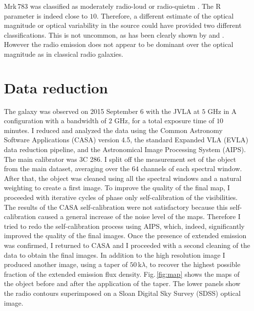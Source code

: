 \documentclass[../thesis.tex]{subfiles}
\begin{document}
Mrk\,783 was classified as moderately radio-loud \citep{Berton15a} or radio-quietm \citep{Doi13}. 
The R parameter is indeed close to $10$. 
Therefore, a different estimate of the optical magnitude or optical variability in the source could have provided two different classifications. 
This is not uncommon, as has been clearly shown by \citet{Ho01} and \citet{Kharb14}.
However the radio emission does not appear to be dominant over the optical magnitude as in classical radio galaxies.




\section{Data reduction}
\label{sec:datared_casa}

The galaxy was observed on 2015 September 6 with the JVLA at $5$ GHz in A configuration with a bandwidth of $2$ GHz, for a total exposure time of $10$ minutes.
I reduced and analyzed the data using the Common Astronomy Software Applications (CASA) version 4.5, the standard Expanded VLA (EVLA) data reduction pipeline, and the Astronomical Image Processing System (AIPS).
The main calibrator was 3C 286. 
I split off the measurement set of the object from the main dataset, averaging over the $64$ channels of each spectral window.
After that, the object was cleaned using all the spectral windows and a natural weighting to create a first image.
To improve the quality of the final map, I proceeded with iterative cycles of phase only self-calibration of the visibilities.
The results of the CASA self-calibration were not satisfactory because this self-calibration caused a general increase of the noise level of the maps.
Therefore I tried to redo the self-calibration process using AIPS, which, indeed, significantly improved the quality of the final images.
Once the presence of extended emission was confirmed, I returned to CASA and I proceeded with a second cleaning of the data to obtain the final images.
In addition to the high resolution image I produced another image, using a taper of $50\,$k$\lambda$, to recover the highest possible fraction of the extended emission flux density.
Fig.\,\ref{fig:map} shows the maps of the object before and after the application of the taper.  
The lower panels show the radio contours superimposed on a Sloan Digital Sky Survey (SDSS) optical image.
\end{document}
